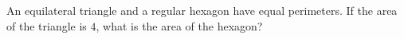 An equilateral triangle and a regular hexagon have equal perimeters. If the area of the triangle is $4$, what is the area of the hexagon?
